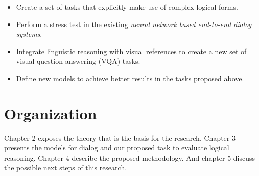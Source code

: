 \begin{itemize}
\item Create a set of tasks that explicitly make use of complex logical forms.
\item Perform a stress test in the existing \textit{neural network based end-to-end dialog systems}.
\item Integrate linguistic reasoning with visual references to create a new set of visual question answering (VQA) tasks.
\item Define new models to achieve better results in the tasks proposed above. 
\end{itemize}

\section{Organization}
\label{sec:organization}

Chapter 2 exposes the theory that is the basis for the research. Chapter 3 presents the models for dialog and our proposed task to evaluate logical reasoning. Chapter 4 describe the proposed methodology. And chapter 5 discuss the possible next steps of this research.
